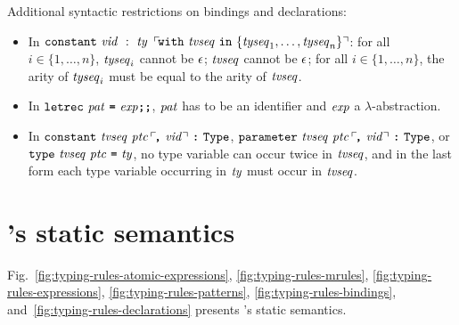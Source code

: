 \documentclass[final]{article}
\begin{document}
\noindent
Additional syntactic restrictions on bindings and declarations:
\begin{itemize}
\item In
  $\mathtt{constant}\ \mathit{vid}\ :\ \mathit{ty}\ \,\ulcorner\!\mathtt{with}\ \mathit{tvseq}\ \mathtt{in}\ \{\mathit{tyseq}_1,\dots,\mathit{tyseq}_n\}\urcorner$:
  for all $i\in\{1,\dots,n\}$, $\mathit{tyseq}_i$ cannot be $\epsilon$;
  $\mathit{tvseq}$ cannot be $\epsilon$;
  for all $i\in\{1,\dots,n\}$, the arity of $\mathit{tyseq}_i$ must be
  equal to the arity of $\mathit{tvseq}$.

\item In $\mathtt{letrec}\ \mathit{pat}\ \textbf{\texttt{=}}\ \mathit{exp}\textbf{\texttt{;}}\textbf{\texttt{;}}$,
  $\mathit{pat}$ has to be an identifier and $\mathit{exp}$ a
  $\lambda$-abstraction.

\item In $\mathtt{constant}\ \mathit{tvseq}\ \mathit{ptc}\,\ulcorner\!\textbf{\texttt{,}}\ \mathit{vid}\urcorner\ \textbf{\texttt{:}}\ \mathtt{Type}$,
  $\mathtt{parameter}\ \mathit{tvseq}\ \mathit{ptc}\,\ulcorner\!\textbf{\texttt{,}}\ \mathit{vid}\urcorner\ \textbf{\texttt{:}}\ \mathtt{Type}$, or
  $\mathtt{type}\ \mathit{tvseq}\ \mathit{ptc}\ \textbf{\texttt{=}}\ \mathit{ty}$, no type
  variable can occur twice in $\mathit{tvseq}$, and in the last form
  each type variable occurring in $\mathit{ty}$ must occur in
  $\mathit{tvseq}$.
\end{itemize}





\section{\eml's static semantics}
\label{sec:semantics}

Fig.~\ref{fig:typing-rules-atomic-expressions},
\ref{fig:typing-rules-mrules},
\ref{fig:typing-rules-expressions},
\ref{fig:typing-rules-patterns},
\ref{fig:typing-rules-bindings},
and~\ref{fig:typing-rules-declarations}
presents \eml's static semantics.
\end{document}

